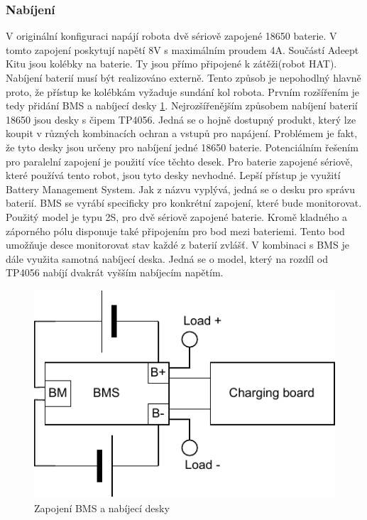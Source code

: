 \subsubsection*{Nabíjení}
V originální konfiguraci napájí robota dvě sériově zapojené 18650 baterie. V tomto zapojení poskytují napětí 8V s maximálním proudem 4A. Součástí Adeept Kitu jsou kolébky na baterie. Ty jsou přímo připojené k zátěži(robot HAT). Nabíjení baterií musí být realizováno externě. Tento způsob je nepohodlný hlavně proto, že přístup ke kolébkám vyžaduje sundání kol robota. Prvním rozšířením je tedy přidání BMS a nabíjecí desky \ref{fig:battery}. 
Nejrozšířenějším způsobem nabíjení baterií 18650 jsou desky s čipem TP4056. Jedná se o hojně dostupný produkt, který lze koupit v různých kombinacích ochran a vstupů pro napájení. Problémem je fakt, že tyto desky jsou určeny pro nabíjení jedné 18650 baterie. Potenciálním řešením pro paralelní zapojení je použití více těchto desek. Pro baterie zapojené sériově, které používá tento robot, jsou tyto desky nevhodné.
Lepší přístup je využití Battery Management System. Jak z názvu vyplývá, jedná se o desku pro správu baterií. BMS se vyrábí specificky pro konkrétní zapojení, které bude monitorovat. Použitý model je typu 2S, pro dvě sériově zapojené baterie. Kromě kladného a záporného pólu disponuje také připojením pro bod mezi bateriemi. Tento bod umožňuje desce monitorovat stav každé z baterií zvlášť.
V kombinaci s BMS je dále využita samotná nabíjecí deska. Jedná se o model, který na rozdíl od TP4056 nabíjí dvakrát vyšším nabíjecím napětím.

\begin{figure}[h!]
	\centering
	\includegraphics[scale=0.75]{obrazky-figures/battery_circuite.pdf}
	\caption{Zapojení BMS a nabíjecí desky}
	\label{fig:battery}
\end{figure}

